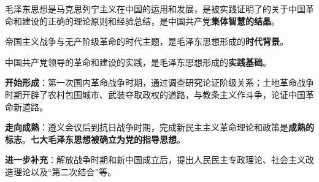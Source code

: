 毛泽东思想是马克思列宁主义在中国的运用和发展，是被实践证明了的关于中国革命和建设的正确的理论原则和经验总结，是中国共产党\textbf{{集体智慧的结晶}}。

帝国主义战争与无产阶级革命的时代主题，是毛泽东思想形成的\textbf{{时代背景}}。

中国共产党领导的革命和建设的实践，是毛泽东思想形成的\textbf{{实践基础}}。

\textbf{{开始形成}}：第一次国内革命战争时期，通过调查研究论证阶级关系；土地革命战争时期开辟了农村包围城市、武装夺取政权的道路，与教条主义作斗争，论证中国革命新道路。

\textbf{{走向成熟}}：遵义会议后到抗日战争时期，完成新民主主义革命理论和政策是\textbf{{成熟的标志}}。\textbf{{七大毛泽东思想被确立为党的指导思想}}。

\textbf{{进一步补充}}{：解放战争时期和新中国成立后，提出人民民主专政理论、社会主义改造理论以及``第二次结合''等。}
